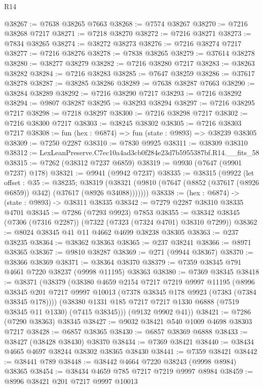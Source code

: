\begin{lexlean}{R14}
\begin{coremodule}
@38267 := @7638 @38265 @7663
@38268 := @7574 @38267
@38270 := @7216 @38268 @7217
@38271 := @7218 @38270
@38272 := @7216 @38271
@38273 := @7834 @38265
@38274 := @38272 @38273
@38276 := @7216 @38274 @7217
@38277 := @7216 @38276
@38278 := @7838 @38265
@38279 := @37614 @38278
@38280 := @38277 @38279
@38282 := @7216 @38280 @7217
@38283 := @38263 @38282
@38284 := @7216 @38283
@38285 := @7647 @38259
@38286 := @37617 @38278
@38287 := @38285 @38286
@38289 := @7638 @38287 @7663
@38290 := @38284 @38289
@38292 := @7216 @38290 @7217
@38293 := @7216 @38292
@38294 := @9807 @38287
@38295 := @38293 @38294
@38297 := @7216 @38295 @7217
@38298 := @7218 @38297
@38300 := @7216 @38298 @7217
@38302 := @7216 @38300 @7217
@38303 := @38245 @38302
@38305 := @7216 @38303 @7217
@38308 := fun (hex : @6874) => fun (state : @9893) => @38239 @38305
@38309 := @7250 @2287
@38310 := @7830 @9925
@38311 := @38309 @38310
@38312 := LexLeanPreserve.C7ec10a4ad3cb0f284e23d7b5955387bf.R14.__fits_58
@38315 := @7262 (@38312 @7237 @6859)
@38319 := @9930 (@7647 (@9901 @7237) @178)
@38321 := @9941 (@9942 @7237)
@38335 := @38315
    (@9922
      (let offset : @35 := @38235;
      @38319 (@38321 (@9810 (@7647 (@8852 (@37617 (@8926 @6859)) @342) (@37617 (@8926 @34088)))))))
@38338 := (hex : @6874) -> (state : @9893) -> @38311 @38335
@38342 := @7279 @2287 @38310 @38335 @4701
@38345 := @7286 (@7293 @9923) @7853
@38355 := @38342 @38345 (@7306 (@7316 @2287)) (@7322 (@7323 (@7324 @4701) @38310 @7299))
@38362 := @8024 @38345 @41 @11 @4662 @4699 @38238 @38305
@38363 := @237 @38235
@38364 := @38362 @38363
@38365 := @237 @38241
@38366 := @8971 @38365
@38367 := @9810 @38287
@38369 := @271 (@9944 @38367)
@38370 := @38366 @38369
@38371 := @38364 @38370
@38379 := @7359 @38345 @791 @4661 @7220 @38237 (@9998 @11195) @38363
@38380 := @7369 @38345
@38418 := @38371
    (@38379
      (@38380
        @4659
        @2154
        @7217
        @7219
        @9997
        @11195
        (@8996 @38345 @201 @7217 @9997 @10013 (@7378 @38345 @178 @9923 (@7383 (@7384 @38345 @178))))
        (@38380 @1331 @185 @7217 @7217 @1330 @6888 (@7519 @38345 @11 @1330) (@7415 @38345)))
      (@9132 @9902 @41))
@38421 := @7286 (@7290 @38363) @38345
@38427 := @9032 @38421 @540 @1009 @4698 @38303 @7217
@38428 := @6857 @38365
@38430 := @6857 @38369 @6888
@38433 := @38427 (@38428 @38430) @38370
@38434 := @7369 @38421
@38440 := @38434 @4665 @4697 @38244 @38302 @38365 @38430
@38441 := @7359 @38421
@38442 := @38441 @789
@38448 := @38442 @4664 @7220 @38243 (@9998 @8984) @38365
@38454 := @38434 @4659 @785 @7217 @7219 @9997 @8984
@38459 := @8996 @38421 @201 @7217 @9997 @10013

\end{coremodule}
\end{lexlean}

